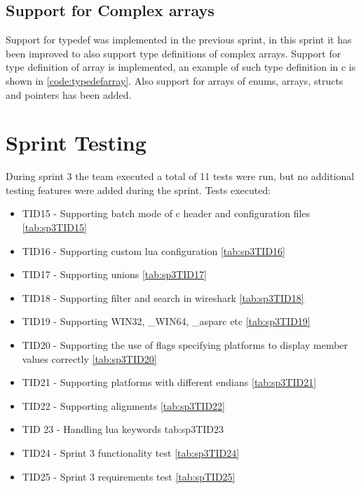 \subsection{Support for Complex \Glspl{array}}
Support for typedef was implemented in the previous sprint, in this sprint it 
has been improved to also support type definitions of complex \glspl{array}. Support 
for type definition of array is implemented, an example of such type 
definition in \Gls{c} is shown in \autoref{code:typedefarray}. Also support for 
\glspl{array} of \glspl{enum}, \glspl{array}, \glspl{struct} and pointers has been added.



\section{Sprint Testing}
During sprint 3 the team executed a total of 11 tests were run, but no additional testing features were added during the sprint. Tests executed:

\begin{itemize}
	\item TID15 - Supporting \gls{batch mode} of \Gls{c} \gls{header} and configuration files \autoref{tab:sp3TID15}
	\item TID16 - Supporting custom \Gls{lua} configuration \autoref{tab:sp3TID16}
	\item TID17 - Supporting \glspl{union} \autoref{tab:sp3TID17}
	\item TID18 - Supporting filter and search in \Gls{wireshark} \autoref{tab:sp3TID18}
	\item TID19 - Supporting WIN32, \_WIN64, \_\gls{asparc} etc \autoref{tab:sp3TID19}
	\item TID20 -  Supporting the use of flags specifying platforms to display \gls{member} values correctly \autoref{tab:sp3TID20}
	\item TID21 - Supporting platforms with different \glspl{endian} \autoref{tab:sp3TID21}
	\item TID22 - Supporting alignments \autoref{tab:sp3TID22}
	\item TID 23 - Handling \Gls{lua} keywords {tab:sp3TID23}
	\item TID24 - Sprint 3 functionality test \autoref{tab:sp3TID24}
	\item TID25 - Sprint 3 requirements test \autoref{tab:spTID25}
\end{itemize}

